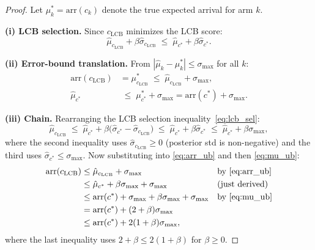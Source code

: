 \documentclass[11pt]{article}
\theoremstyle{definition}
\theoremstyle{remark}
\begin{document}
\begin{proof}
Let $\mu^*_k = \mathrm{arr}(c_k)$ denote the true expected arrival for arm $k$.

\noindent\textbf{(i) LCB selection.}
Since $c_{\mathrm{LCB}}$ minimizes the LCB score:
\begin{equation}
\hat\mu_{c_{\mathrm{LCB}}} + \beta\hat\sigma_{c_{\mathrm{LCB}}}
\;\leq\; \hat\mu_{c^*} + \beta\hat\sigma_{c^*}.
\label{eq:lcb_sel}
\end{equation}

\noindent\textbf{(ii) Error-bound translation.}
From $|\hat\mu_k - \mu^*_k| \leq \sigma_{\max}$ for all $k$:
\begin{align}
\mathrm{arr}(c_{\mathrm{LCB}})
&= \mu^*_{c_{\mathrm{LCB}}}
 \;\leq\; \hat\mu_{c_{\mathrm{LCB}}} + \sigma_{\max},
\label{eq:arr_ub}\\
\hat\mu_{c^*}
&\;\leq\; \mu^*_{c^*} + \sigma_{\max}
 = \mathrm{arr}(c^*) + \sigma_{\max}.
\label{eq:mu_ub}
\end{align}

\noindent\textbf{(iii) Chain.}
Rearranging the LCB selection inequality~\eqref{eq:lcb_sel}:
\[
\hat\mu_{c_{\mathrm{LCB}}}
\;\leq\; \hat\mu_{c^*} + \beta\bigl(\hat\sigma_{c^*} - \hat\sigma_{c_{\mathrm{LCB}}}\bigr)
\;\leq\; \hat\mu_{c^*} + \beta\hat\sigma_{c^*}
\;\leq\; \hat\mu_{c^*} + \beta\sigma_{\max},
\]
where the second inequality uses $\hat\sigma_{c_{\mathrm{LCB}}}\geq 0$
(posterior std is non-negative) and the third uses
$\hat\sigma_{c^*}\leq\sigma_{\max}$.
Now substituting into \eqref{eq:arr_ub} and then \eqref{eq:mu_ub}:
\begin{align*}
\mathrm{arr}(c_{\mathrm{LCB}})
&\leq \hat\mu_{c_{\mathrm{LCB}}} + \sigma_{\max}
&&\text{by \eqref{eq:arr_ub}}\\
&\leq \hat\mu_{c^*} + \beta\sigma_{\max} + \sigma_{\max}
&&\text{(just derived)}\\
&\leq \mathrm{arr}(c^*) + \sigma_{\max} + \beta\sigma_{\max} + \sigma_{\max}
&&\text{by \eqref{eq:mu_ub}}\\
&= \mathrm{arr}(c^*) + (2 + \beta)\sigma_{\max}\\
&\leq \mathrm{arr}(c^*) + 2(1+\beta)\sigma_{\max},
\end{align*}
where the last inequality uses $2+\beta \leq 2(1+\beta)$ for $\beta \geq 0$.
\end{proof}
\end{document}
